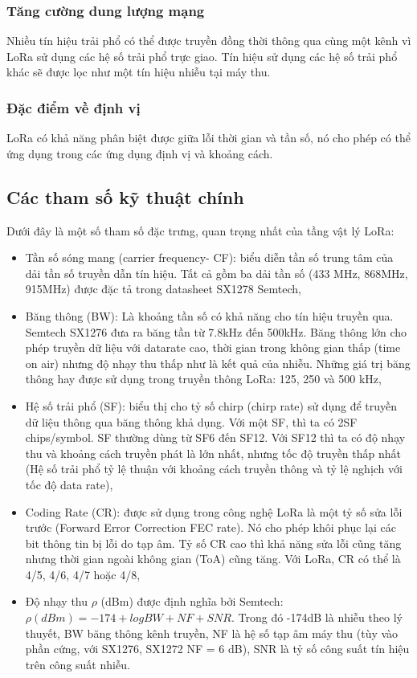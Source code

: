 \subsubsection{	Tăng cường dung lượng mạng}
Nhiều tín hiệu trải phổ có thể được truyền đồng thời thông qua cùng một kênh vì LoRa sử dụng các hệ số trải phổ trực giao. Tín hiệu sử dụng các hệ số trải phổ khác sẽ được lọc như một tín hiệu nhiễu tại máy thu.
\subsubsection{	Đặc điểm về định vị}
LoRa có khả năng phân biệt được giữa lỗi thời gian và tần số, nó cho phép có thể ứng dụng trong các ứng dụng định vị và khoảng cách.

\subsection{Các tham số kỹ thuật chính}
Dưới đây là một số tham số đặc trưng, quan trọng nhất của tầng vật lý LoRa:
\begin{itemize}
\item Tần số sóng mang (carrier frequency- CF): biểu diễn tần số trung tâm của dải tần số truyền dẫn tín hiệu. Tất cả gồm ba dải tần số (433 MHz, 868MHz, 915MHz) được đặc tả trong datasheet SX1278 Semtech,
\item Băng thông (BW): Là khoảng tần số có khả năng cho tín hiệu truyền qua. Semtech SX1276 đưa ra băng tần từ 7.8kHz đến 500kHz. Băng thông lớn cho phép truyền dữ liệu với datarate cao, thời gian trong không gian thấp (time on air) nhưng độ nhạy thu thấp như là kết quả của nhiễu. Những giá trị băng thông hay được sử dụng trong truyền thông LoRa: 125, 250 và 500 kHz,
\item Hệ số trải phổ (SF): biểu thị cho tỷ số chirp (chirp rate) sử dụng để truyền dữ liệu thông qua băng thông khả dụng. Với một SF, thì ta có 2SF chips/symbol. SF thường dùng từ SF6 đến SF12. Với SF12 thì ta có độ nhạy thu và khoảng cách truyền phát là lớn nhất, nhưng tốc độ truyền thấp nhất (Hệ số trải phổ tỷ lệ thuận với khoảng cách truyền thông và tỷ lệ nghịch với tốc độ data rate),
\item Coding Rate (CR): được sử dụng trong công nghệ LoRa là một tỷ số sửa lỗi trước (Forward Error Correction FEC rate). Nó cho phép khôi phục lại các bit thông tin bị lỗi do tạp âm. Tỷ số CR cao thì khả năng sửa lỗi cũng tăng nhưng thời gian ngoài không gian (ToA) cũng tăng. Với LoRa, CR có thể là 4/5, 4/6, 4/7 hoặc 4/8,
\item Độ nhạy thu $\rho$ (dBm) được định nghĩa bởi Semtech: $\rho (dBm) = −174 + logBW + NF + SNR$. Trong đó -174dB là nhiễu theo lý thuyết, BW băng thông kênh truyền, NF là hệ số tạp âm máy thu (tùy vào phần cứng, với SX1276, SX1272 NF = 6 dB), SNR là tỷ số công suất tín hiệu trên công suất nhiễu.

\end{itemize}

